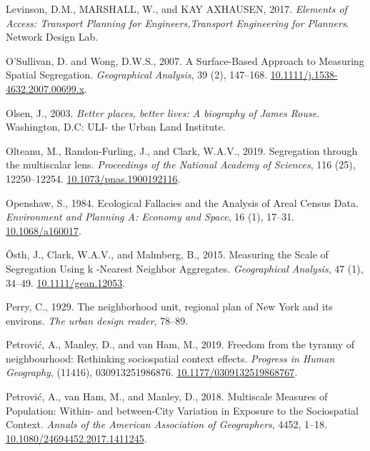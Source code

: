 \documentclass[
  10pt,
]{article}
\newlength{\cslhangindent}
\newenvironment{CSLReferences}[2] %
 {%
  \setlength{\parindent}{0pt}
  \ifodd #1 \everypar{\setlength{\hangindent}{\cslhangindent}}\ignorespaces\fi
  \ifnum #2 > 0
  \setlength{\parskip}{#2\baselineskip}
  \fi
 }%
 {}
\begin{document}
\begin{CSLReferences}{1}{0}
\leavevmode{}%
Levinson, D.M., MARSHALL, W., and KAY AXHAUSEN, 2017. \emph{Elements of
{Access}: {Transport Planning} for {Engineers},{Transport Engineering}
for {Planners}}. {Network Design Lab}.

\leavevmode{}%
O'Sullivan, D. and Wong, D.W.S., 2007. A {Surface-Based Approach} to
{Measuring Spatial Segregation}. \emph{Geographical Analysis}, 39 (2),
147--168.
\href{https://doi.org/10.1111/j.1538-4632.2007.00699.x}{10.1111/j.1538-4632.2007.00699.x}.

\leavevmode{}%
Olsen, J., 2003. \emph{Better places, better lives: A biography of
{James Rouse}}. {Washington, D.C}: {ULI- the Urban Land Institute}.

\leavevmode{}%
Olteanu, M., Randon-Furling, J., and Clark, W.A.V., 2019. Segregation
through the multiscalar lens. \emph{Proceedings of the National Academy
of Sciences}, 116 (25), 12250--12254.
\href{https://doi.org/10.1073/pnas.1900192116}{10.1073/pnas.1900192116}.

\leavevmode{}%
Openshaw, S., 1984. Ecological {Fallacies} and the {Analysis} of {Areal
Census Data}. \emph{Environment and Planning A: Economy and Space}, 16
(1), 17--31. \href{https://doi.org/10.1068/a160017}{10.1068/a160017}.

\leavevmode{}%
Östh, J., Clark, W.A.V., and Malmberg, B., 2015. Measuring the {Scale}
of {Segregation Using} k -{Nearest Neighbor Aggregates}.
\emph{Geographical Analysis}, 47 (1), 34--49.
\href{https://doi.org/10.1111/gean.12053}{10.1111/gean.12053}.

\leavevmode{}%
Perry, C., 1929. The neighborhood unit, regional plan of {New York} and
its environs. \emph{The urban design reader}, 78--89.

\leavevmode{}%
Petrović, A., Manley, D., and van Ham, M., 2019. Freedom from the
tyranny of neighbourhood: {Rethinking} sociospatial context effects.
\emph{Progress in Human Geography}, (11416), 030913251986876.
\href{https://doi.org/10.1177/0309132519868767}{10.1177/0309132519868767}.

\leavevmode{}%
Petrović, A., van Ham, M., and Manley, D., 2018. Multiscale {Measures}
of {Population}: {Within-} and between-{City Variation} in {Exposure} to
the {Sociospatial Context}. \emph{Annals of the American Association of
Geographers}, 4452, 1--18.
\href{https://doi.org/10.1080/24694452.2017.1411245}{10.1080/24694452.2017.1411245}.


\end{CSLReferences}
\end{document}
